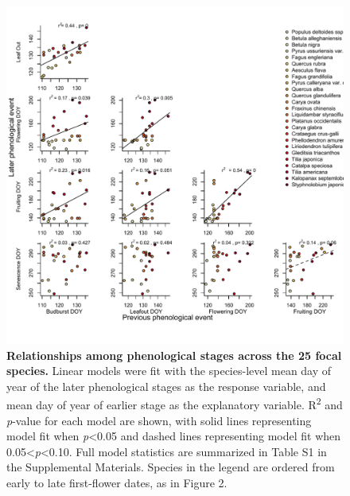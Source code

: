 \documentclass{article}
\begin{document}
  \begin{figure}[h]
  \centering
  \includegraphics{../analyses/figures/latevearly_rp_col_legend_YOR.pdf}
  
  \caption{\textbf{Relationships among phenological stages across the 25 focal species.} Linear models were fit with the species-level mean day of year of the later phenological stages as the response variable, and mean day of year of earlier stage as the explanatory variable. R\textsuperscript{2} and \textit{p}-value for each model are shown, with solid lines representing model fit when \textit{p}<0.05 and dashed lines representing model fit when 0.05<\textit{p}<0.10. Full model statistics are summarized in Table S1 in the Supplemental Materials. Species in the legend are ordered from early to late first-flower dates, as in Figure 2.} %
  \label{fig:latevearly}
\end{figure}
\end{document}

